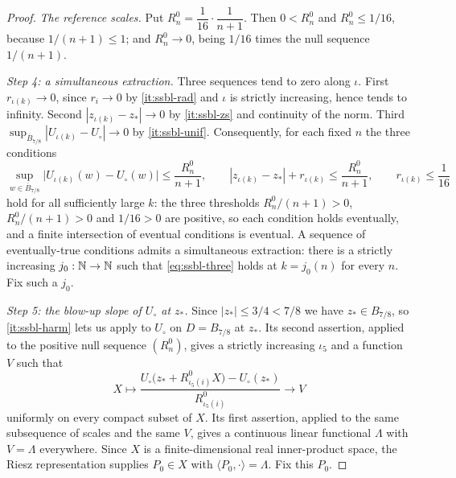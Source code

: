 \begin{proof}
\emph{The reference scales.} Put $R^0_n=\dfrac1{16}\cdot\dfrac1{n+1}$. Then
$0<R^0_n$ and $R^0_n\le1/16$, because $1/(n+1)\le1$; and $R^0_n\to0$, being
$1/16$ times the null sequence $1/(n+1)$.

\emph{Step 4: a simultaneous extraction.} Three sequences tend to zero along
$\iota$. First $r_{\iota(k)}\to0$, since $r_i\to0$ by \ref{it:ssbl-rad} and
$\iota$ is strictly increasing, hence tends to infinity. Second
$|z_{\iota(k)}-z_*|\to0$ by \ref{it:ssbl-zs} and continuity of the norm. Third
$\sup_{\overline B_{7/8}}|U_{\iota(k)}-U_\circ|\to0$ by \ref{it:ssbl-unif}.
Consequently, for each fixed $n$ the three conditions
\begin{equation}\label{eq:ssbl-three}
  \sup_{w\in\overline B_{7/8}}\bigl|U_{\iota(k)}(w)-U_\circ(w)\bigr|
    \le\frac{R^0_n}{n+1},\qquad
  |z_{\iota(k)}-z_*|+r_{\iota(k)}\le\frac{R^0_n}{n+1},\qquad
  r_{\iota(k)}\le\frac1{16}
\end{equation}
hold for all sufficiently large $k$: the three thresholds
$R^0_n/(n+1)>0$, $R^0_n/(n+1)>0$ and $1/16>0$ are positive, so each condition
holds eventually, and a finite intersection of eventual conditions is eventual.
A sequence of eventually-true conditions admits a simultaneous extraction:
there is a strictly increasing $j_0:\mathbb{N}\to\mathbb{N}$ such that \eqref{eq:ssbl-three}
holds at $k=j_0(n)$ for every $n$. Fix such a $j_0$.

\emph{Step 5: the blow-up slope of $U_\circ$ at $z_*$.} Since $|z_*|\le3/4<7/8$
we have $z_*\in B_{7/8}$, so \ref{it:ssbl-harm} lets us apply
 to $U_\circ$ on $D=B_{7/8}$ at $z_*$. Its second
assertion, applied to the positive null sequence $(R^0_n)$, gives a strictly
increasing $\iota_5$ and a function $V$ such that
\[
  X\mapsto\frac{U_\circ\bigl(z_*+R^0_{\iota_5(i)}X\bigr)-U_\circ(z_*)}
                {R^0_{\iota_5(i)}}
  \longrightarrow V
\]
uniformly on every compact subset of $X$. Its first assertion, applied to the
same subsequence of scales and the same $V$, gives a continuous linear
functional $\Lambda$ with $V=\Lambda$ everywhere. Since $X$ is a
finite-dimensional real inner-product space, the Riesz representation supplies
$P_0\in X$ with $\langle P_0,\cdot\rangle=\Lambda$. Fix this $P_0$.


\end{proof}
